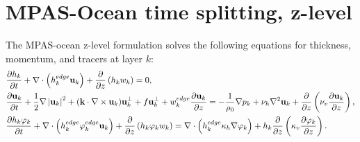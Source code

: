 \documentclass[11pt]{report}
\newcommand{\ds}{\displaystyle}
\begin{document}
\section{MPAS-Ocean time splitting, z-level}
The MPAS-ocean z-level formulation solves the following equations for thickness, momentum, and tracers at layer $k$:
\begin{eqnarray}   
&\label{h1} \ds
\frac{\partial h_k}{\partial t} 
 + \nabla \cdot \left( h_k^{edge} {\bf u}_k \right) 
 + \frac{\partial}{\partial z} \left( h_k w_k \right) = 0,
\\
&\label{u1} \ds
\frac{\partial {\bf u}_k}{\partial t} 
+ \frac{1}{2}\nabla \left| {\bf u}_k \right|^2 
+ ( {\bf k} \cdot \nabla \times {\bf u}_k) {\bf u}^\perp_k 
+ f{\bf u}^{\perp}_k 
+ w_k^{edge}\frac{\partial {\bf u}_k}{\partial z}
  = - \frac{1}{\rho_0}\nabla p_k  
   +\nu_h\nabla^2{\bf u}_k
 + \frac{\partial }{\partial z} 
\left( \nu_v \frac{\partial {\bf u}_k}{\partial z} \right), \\
&\label{continuous_tracer1} \ds
\frac{\partial h_k\varphi_k}{\partial t} 
 + \nabla \cdot \left( h_k^{edge}\varphi_k^{edge} {\bf u}_k \right) 
 + \frac{\partial}{\partial z} \left( h_k\varphi_k w_k \right) 
= \nabla\cdot\left(h_k^{edge} \kappa_h \nabla\varphi_k \right)
+ h_k \frac{\partial }{\partial z} 
  \left( \kappa_v \frac{\partial \varphi_k}{\partial z} \right).
\end{eqnarray}
\end{document}
